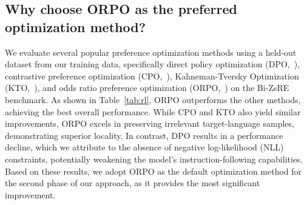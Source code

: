 \subsection{Why choose ORPO as the preferred optimization method?}
We evaluate several popular preference optimization methods using a held-out dataset from our training data, specifically direct policy optimization (DPO,~\citealp[]{rafailov2023direct}), contrastive preference optimization (CPO,~\citealp[]{xu2024contrastive}), Kahneman-Tversky Optimization (KTO,~\citealp[]{ethayarajh2024kto}), and odds ratio preference optimization (ORPO,~\citealp[]{hong2403orpo}) on the Bi-ZsRE benchmark. 
As shown in Table~\ref{tab:rl}, ORPO outperforms the other methods, achieving the best overall performance. While CPO and KTO also yield similar improvements, ORPO excels in preserving irrelevant target-language samples, demonstrating superior locality. In contrast, DPO results in a performance decline, which we attribute to the absence of negative log-likelihood (NLL) constraints, potentially weakening the model’s instruction-following capabilities. Based on these results, we adopt ORPO as the default optimization method for the second phase of our approach, as it provides the most significant improvement.


\begin{table}[H]
\centering
{}
\caption{
\textbf{Effects of different preference optimization methods} with single edit setting on en-zh. Shades of cell color represent differences between preference optimization methods and simply SFT, where \textcolor{b4}{blue} denotes better performance while \textcolor{r4}{red} indicates worse.
}
\label{tab:rl}
\end{table}
